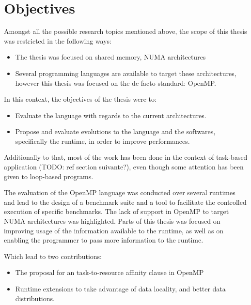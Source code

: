 \section{Objectives}\label{sec:intro:objectives}

Amongst all the possible research topics mentioned above, the scope of this thesis was restricted in the following ways:

\begin{itemize}
  \item The thesis was focused on shared memory, NUMA architectures
  \item Several programming languages are available to target these architectures, however this thesis was focused on the de-facto standard: OpenMP.
\end{itemize}

In this context, the objectives of the thesis were to:
\begin{itemize}
 \item Evaluate the language with regards to the current architectures.
 \item Propose and evaluate evolutions to the language and the softwares, specifically the runtime, in order to improve performances.
\end{itemize}

Additionally to that, most of the work has been done in the context of task-based application (TODO: ref section suivante?), even though some attention has been given to loop-based programs.

The evaluation of the OpenMP language was conducted over several runtimes and lead to the design of a benchmark suite and a tool to facilitate the controlled execution of specific benchmarks.
The lack of support in OpenMP to target NUMA architectures was highlighted.
Parts of this thesis was focused on improving usage of the information available to the runtime, as well as on enabling the programmer to pass more information to the runtime.

Which lead to two contributions:
\begin{itemize}
 \item The proposal for an task-to-resource affinity clause in OpenMP
 \item Runtime extensions to take advantage of data locality, and better data distributions.
\end{itemize}



